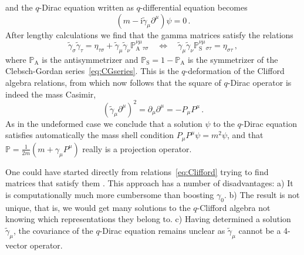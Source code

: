 \documentclass[12pt,a4paper]{article}
\newcommand{\I}{\mathrm{i}}
\newcommand{\R}{\mathcal{R}}
\newcommand{\RII}{ \mathcal{R}_{\mathrm{II}} }
\newcommand{\Proj}{\mathbb{P}}
\begin{document}
and the $q$-Dirac equation written as $q$-differential equation becomes
\begin{equation}
  (m - \I \tilde{\gamma}_\mu \partial^\mu)\psi = 0 \,.
\end{equation}
After lengthy calculations we find that the gamma matrices satisfy the
relations
\begin{equation}
\label{eq:Clifford}
  \tilde{\gamma}_\sigma  \tilde{\gamma}_\tau
  = \eta_{\tau\sigma} + \tilde{\gamma}_\mu \tilde{\gamma}_\nu
  \Proj_\mathrm{A}^{\nu\mu}{}_{\tau\sigma}
  \quad \Leftrightarrow \quad
  \tilde{\gamma}_\mu \tilde{\gamma}_\nu
  \Proj_\mathrm{S}^{\nu\mu}{}_{\sigma\tau} = \eta_{\sigma\tau}\,,
\end{equation}
where $\Proj_\mathrm{A}$ is the antisymmetrizer and $\Proj_\mathrm{S}
= 1 - \Proj_\mathrm{A}$ is the symmetrizer of the Clebsch-Gordan
series~\eqref{eq:CGseries}. This is the $q$-deformation of the
Clifford algebra relations, from which now follows that the square of
$q$-Dirac operator is indeed the mass Casimir,
\begin{equation}
  (\tilde{\gamma}_\mu \partial^\mu)^2 = \partial_\mu \partial^\mu
  = -P_\mu P^\mu \,.
\end{equation}
As in the undeformed case we conclude that a solution $\psi$ to the
$q$-Dirac equation satisfies automatically the mass shell condition
$P_\mu P^\mu \psi = m^2 \psi$, and that $\Proj =
\frac{1}{2m}(m+\gamma_\mu P^\mu)$ really is a projection operator.


One could have started directly from relations~\eqref{eq:Clifford}
trying to find matrices that satisfy them \cite{Schirrmacher:1992}.
This approach has a number of disadvantages: a) It is computationally
much more cumbersome than boosting $\gamma_0$. b) The result is not
unique, that is, we would get many solutions to the $q$-Clifford
algebra not knowing which representations they belong to. c) Having
determined a solution $\tilde{\gamma}_\mu$, the covariance of the
$q$-Dirac equation remains unclear as $\tilde{\gamma}_\mu$ cannot be a
4-vector operator.
\end{document}
